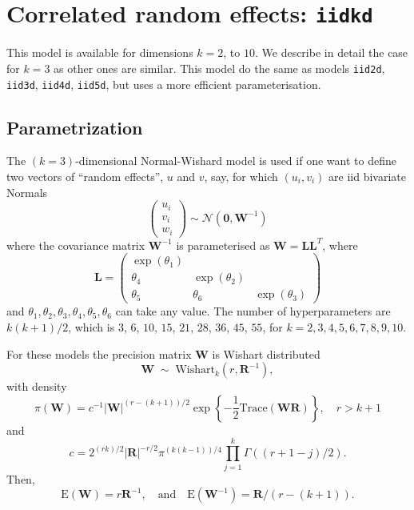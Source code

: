 \documentclass[a4paper,11pt]{article}
\begin{document}
\section*{Correlated random effects: \texttt{iidkd}}

This model is available for dimensions $k=2$, to $10$. We describe in
detail the case for $k=3$ as other ones are similar. This model do the
same as models \texttt{iid2d}, \texttt{iid3d}, \texttt{iid4d},
\texttt{iid5d}, but uses a more efficient parameterisation. 

\subsection*{Parametrization}

The $(k=3)$-dimensional Normal-Wishard model is used if one want to define
two vectors of ``random effects'', $u$ and $v$, say, for which
$(u_{i}, v_{i})$ are iid bivariate Normals
\begin{displaymath}
    \left(
      \begin{array}{c}
        u_{i}\\
        v_{i}\\
        w_{i}
      \end{array}\right)
    \sim \mathcal{N}\left(\mathbf{0}, \mathbf{W}^{-1}\right)
\end{displaymath}
where the  covariance matrix $\mathbf{W}^{-1}$ is parameterised as
$\mathbf{W}=\mathbf{L}\mathbf{L}^{T}$, where
\begin{equation}
    \label{precision}
    \mathbf{L} = \left(\begin{array}{ccc}
                         \exp(\theta_1) & & \\
                         \theta_4 & \exp(\theta_2) & \\
                         \theta_5 & \theta_6 & \exp(\theta_3)
      \end{array}\right)
\end{equation}
and $\theta_1, \theta_2, \theta_3, \theta_4, \theta_5, \theta_6$ can
take any value. The number of hyperparameters are $k(k+1)/2$, which is
$3$, $6$, $10$, $15$, $21$, $28$, $36$, $45$, $55$, for
$k=2, 3, 4, 5, 6, 7, 8, 9, 10$.

For these models the precision matrix $\mathbf{W}$ is Wishart
distributed
\begin{displaymath}
    \mathbf{W}
    \;\sim\;\text{Wishart}_{k}(r, \mathbf{R}^{-1}), 
\end{displaymath}
with density
\begin{displaymath}
    \pi(\mathbf{W}) = c^{-1} |\mathbf{W}|^{(r-(k+1))/2} \exp\left\{
      -\frac{1}{2}\text{Trace}(\mathbf{W}\mathbf{R})\right\}, \quad r > k+1
\end{displaymath}
and
\begin{displaymath}
    c = 2^{(rk)/2} |\mathbf{R}|^{-r/2} \pi^{(k(k-1))/4}\prod_{j=1}^{k}
    \Gamma((r+1-j)/2).
\end{displaymath}
Then,
\begin{displaymath}
    \text{E}(\mathbf{W}) = r\mathbf{R}^{-1}, \quad\text{and}\quad
    \text{E}(\mathbf{W}^{-1}) = \mathbf{R}/(r-(k+1)).
\end{displaymath}
\end{document}
